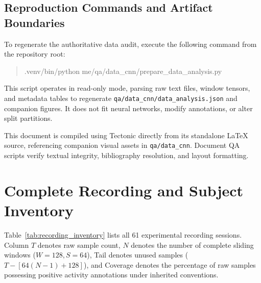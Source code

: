 \documentclass[11pt,a4paper]{article}
\newcommand{\code}[1]{{\small\ttfamily\nolinkurl{#1}}}
\theoremstyle{definition}
\begin{document}
\subsection{Reproduction Commands and Artifact Boundaries}
To regenerate the authoritative data audit, execute the following command from the repository root:
\begin{quote}\small\ttfamily
.venv/bin/python me/qa/data\_cnn/prepare\_data\_analysis.py
\end{quote}
This script operates in read-only mode, parsing raw text files, window tensors, and metadata tables to regenerate \code{qa/data_cnn/data_analysis.json} and companion figures. It does not fit neural networks, modify annotations, or alter split partitions.

This document is compiled using Tectonic directly from its standalone LaTeX source, referencing companion visual assets in \code{qa/data_cnn}. Document QA scripts verify textual integrity, bibliography resolution, and layout formatting.

\appendix
\clearpage
\section{Complete Recording and Subject Inventory}\label{app:inventory}
Table~\ref{tab:recording_inventory} lists all 61 experimental recording sessions. Column $T$ denotes raw sample count, $N$ denotes the number of complete sliding windows ($W=128, S=64$), Tail denotes unused samples ($T - [64(N-1) + 128]$), and Coverage denotes the percentage of raw samples possessing positive activity annotations under inherited conventions.
\end{document}
